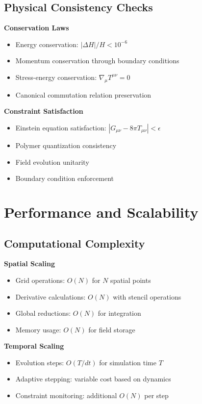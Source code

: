 \documentclass[11pt]{article}
\begin{document}
\subsection{Physical Consistency Checks}

\textbf{Conservation Laws}
\begin{itemize}
\item Energy conservation: $|\Delta H|/H < 10^{-6}$
\item Momentum conservation through boundary conditions
\item Stress-energy conservation: $\nabla_\mu T^{\mu\nu} = 0$
\item Canonical commutation relation preservation
\end{itemize}

\textbf{Constraint Satisfaction}
\begin{itemize}
\item Einstein equation satisfaction: $|G_{\mu\nu} - 8\pi T_{\mu\nu}| < \epsilon$
\item Polymer quantization consistency
\item Field evolution unitarity
\item Boundary condition enforcement
\end{itemize}

\section{Performance and Scalability}

\subsection{Computational Complexity}

\textbf{Spatial Scaling}
\begin{itemize}
\item Grid operations: $O(N)$ for $N$ spatial points
\item Derivative calculations: $O(N)$ with stencil operations
\item Global reductions: $O(N)$ for integration
\item Memory usage: $O(N)$ for field storage
\end{itemize}

\textbf{Temporal Scaling}
\begin{itemize}
\item Evolution steps: $O(T/dt)$ for simulation time $T$
\item Adaptive stepping: variable cost based on dynamics
\item Constraint monitoring: additional $O(N)$ per step
\end{itemize}
\end{document}

